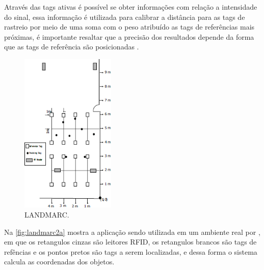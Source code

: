     \par
    Através das tags ativas é possível se obter informações com relação a intensidade do sinal, essa informação é utilizada para calibrar a distância para as tags de rastreio por meio de uma soma com o peso atribuído as tags de referências mais próximas, é importante resaltar que a precisão dos resultados depende da forma que as tags de referência são posicionadas \cite{RFIDapplicationsTechniques}.
    
    \begin{figure}[H]
              \caption{\label{fig:landmarc2a}{LANDMARC.}}
              \centering
              \includegraphics[width=0.4\textwidth]{Figuras/landmarc2a.png}
        \end{figure}
    \par
    Na \autoref{fig:landmarc2a} mostra a aplicação sendo utilizada em um ambiente real por \citeauthor{landmarc}, em que os retangulos cinzas são leitores RFID, os retangulos brancos são tags de refências e os pontos pretos são tags a serem localizadas, e dessa forma o sistema calcula as coordenadas dos objetos.

